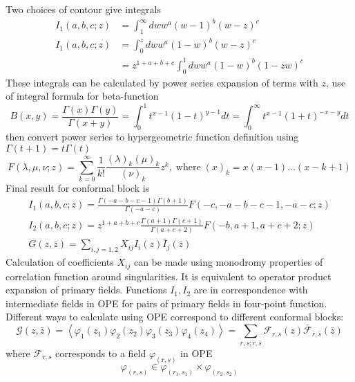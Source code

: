 \documentclass[a4paper,12pt]{article}
\theoremstyle{definition}
\theoremstyle{definition}
\theoremstyle{definition}
\begin{document}
Two choices of contour \cite{difrancesco1997cft} give integrals
\begin{equation}
  \label{eq:63}
  \begin{array}{ll}
    I_{1}(a,b,c; z) &= \int_{1}^{\infty} dw w^{a} (w-1)^{b} (w-z)^{c}\\
    I_{1}(a,b,c; z) &= \int_{0}^{z} dw w^{a} (1-w)^{b} (w-z)^{c}\\
    &=z^{1+a+b+c}\int_{0}^{1}dw  w^{a}(1-w)^{b}(1-zw)^{c}
  \end{array}
\end{equation}
These integrals can be calculated by power series expansion of terms with $z$, use of integral
formula for beta-function 
\begin{equation}
  \label{eq:64}
    B(x,y)=\frac{\Gamma(x)\Gamma(y)}{\Gamma(x+y)} = \int_{0}^{1} t^{x-1} (1-t)^{y-1} dt =
    \int_{0}^{\infty} t^{x-1} (1+t)^{-x-y} dt
  \end{equation}
then convert power series to hypergeometric function definition using $\Gamma(t+1)=t\Gamma(t)$
\begin{equation}  
  F(\lambda,\mu,\nu; z)=\sum_{k=0}^{\infty}\frac{1}{k!}\frac{(\lambda)_{k}(\mu)_{k}}{(\nu)_{k}}
  z^{k}, \;\mbox{where}\; (x)_{k}=x(x-1)\dots (x-k+1)
\end{equation}
Final result for conformal block is
\begin{eqnarray}
  \label{eq:65}
  I_{1}(a,b,c;z)=\frac{\Gamma(-a-b-c-1)\Gamma(b+1)}{\Gamma(-a-c)} F(-c,-a-b-c-1,-a-c; z)\\
  I_{2}(a,b,c;z)=z^{1+a+b+c}\frac{\Gamma(a+1)\Gamma(c+1)}{\Gamma(a+c+2)} F(-b,a+1,a+c+2; z)\\
  G(z,\bar z)=\sum_{i,j=1,2}X_{ij} I_{i}(z) \bar I_{j}(\bar z)
\end{eqnarray}
Calculation of coefficients $X_{ij}$ can be made using monodromy properties of correlation function
around singularities. It is equivalent to operator product expansion of primary fields. Functions
$I_{1}, I_{2}$ are in correspondence with intermediate fields in OPE for pairs of primary fields in
four-point function. Different ways to calculate using OPE correspond to different conformal blocks:
\begin{equation}
  \label{eq:66}
  \mathcal{G}(z,\bar z) =
  \left<\varphi_{1}(z_{1})\varphi_{2}(z_{2})\varphi_{3}(z_{3})\varphi_{4}(z_{4})\right> =
  \sum_{r,s;\bar r, \bar s}\mathcal{F}_{r,s}(z) \bar{\mathcal{F}}_{\bar r,\bar s}(\bar z)
\end{equation}
where $\mathcal{F}_{r,s}$ corresponds to a field $\varphi_{(r,s)}$ in OPE
\begin{equation}
  \label{eq:67}
  \varphi_{(r,s)}\in \varphi_{(r_{1},s_{1})}\times \varphi_{(r_{2},s_{2})}
\end{equation}
\end{document}
